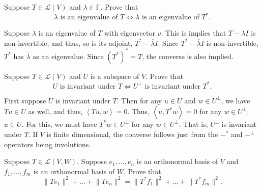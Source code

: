 \documentclass[12 pt, letterpaper]{hmcpset}
\begin{document}
\pagebreak

\begin{problem}[3]
	Suppose $T \in \mathcal{L}(V)$ and $\lambda \in \mathbb{F}$. Prove that
	\[
		\lambda \text{ is an eigenvalue of } T \iff \overline{\lambda} \text{ is an eigenvalue of } T^{*}.
	\]
\end{problem}

\begin{solution}
	Suppose $\lambda$ is an eigenvalue of $T$ with eigenvector $v$. This is implies that $T - \lambda I$ is non-invertible, and thus, so is its adjoint, $T^{*} - \overline{\lambda} I$. Since $T^{*} - \overline{\lambda} I$ is non-invertible, $T^{*}$ has $\overline{\lambda}$ as an eigenvalue. Since $(T^{*})^{*} = T$, the converse is also implied.
\end{solution}

\pagebreak

\begin{problem}[4]
	Suppose $T \in \mathcal{L}(V)$ and $U$ is a subspace of $V$. Prove that
	\[
		U \text{ is invariant under } T \iff U^{\perp} \text{ is invariant under } T^{*}.
	\]
\end{problem}

\begin{solution}
	First suppose $U$ is invariant under $T$. Then for any $u \in U$ and $w \in U^{\perp}$, we have $Tu \in U$ as well, and thus, $\left < Tu, w  \right > = 0$. Thus, $\left < u, T^{*}w \right > = 0$ for any $w \in U^{\perp}$, $u \in U$. For this, we must have $T^{*} w \in U^{\perp}$ for any $w \in U^{\perp}$. That is, $U^{\perp}$ is invariant under $T$. If $V$ is finite dimensional, the converse follows just from the $-^{*}$ and $-^{\perp}$ operators being involutions.
\end{solution}

\pagebreak

\begin{problem}[5]
	Suppose $T \in \mathcal{L}(V, W)$. Suppose $e_{1}, \dots, e_{n}$ is an orthonormal basis of $V$ and $f_{1}, \dots, f_{m}$ is an orthonormal basis of $W$. Prove that
	\[
		\lVert T e_{1} \rVert^{2} + \dots + \lVert T e_{n} \rVert^{2} = \lVert T^{*} f_{1} \rVert^{2} + \dots + \lVert T^{*} f_{m} \rVert^{2}.
	\]
\end{problem}
\end{document}
